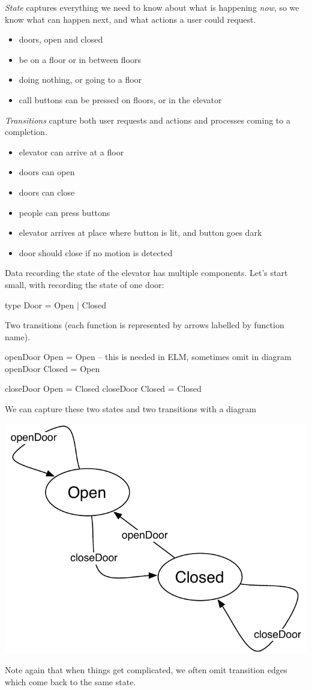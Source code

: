 \documentclass[12pt]{amsbook}
\begin{document}
\emph{State} captures everything we need to know about what is happening \emph{now},
so we know what can happen next, and what actions a user could request.
\begin{itemize}
    \item doors, open and closed
    \item be on a floor or in between floors
    \item doing nothing, or going to a floor
    \item call buttons can be pressed on floors, or in the elevator
\end{itemize}
\emph{Transitions} capture both user requests and actions and processes coming to a completion.
\begin{itemize}
    \item elevator can arrive at a floor
    \item doors can open
    \item doors can close
    \item people can press buttons
    \item elevator arrives at place where button is lit, and button goes dark
    \item door should close if no motion is detected

\end{itemize}
    
\medskip
Data recording the state of the elevator has multiple components.
Let's start small, with recording the state of one door:
\vspace{-12pt}
\begin{code}
type Door = Open | Closed
\end{code}
Two transitions (each function is represented by arrows labelled by function name).
\vspace{-12pt}
\begin{code}
openDoor Open   = Open    -- this is needed in ELM, sometimes omit in diagram
openDoor Closed = Open

closeDoor Open   = Closed
closeDoor Closed = Closed
\end{code}

We can capture these two states and two transitions with a diagram

\begin{center}
\includegraphics[width=.5\textwidth]{openClose.pdf}
\end{center}
Note again that when things get complicated, 
we often omit transition edges which come back to the same state.
\end{document}
